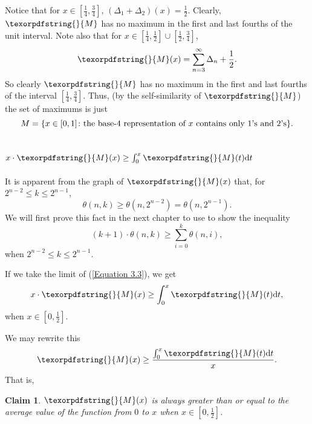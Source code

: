 \documentclass[12pt]{ucthesis}
\theoremstyle{plain}
\newtheorem{claim}{Claim}
\theoremstyle{definition}
\newcommand{\takagi}{
  \texorpdfstring{\protect}{M}
}
\begin{document}
Notice that for $x \in [\frac{1}{4}, \frac{3}{4}]$, $(\Delta_1 + \Delta_2)(x) = \frac{1}{2}$.
Clearly, $\takagi$ has no maximum in the first and last fourths of the unit interval.
Note also that for $x \in [\frac{1}{4}, \frac{1}{2}] \cup [\frac{1}{2}, \frac{3}{4}]$,
\begin{equation*}
\takagi(x) = \sum_{n = 3}^\infty \Delta_n + \frac{1}{2}.
\end{equation*}
So clearly $\takagi$ has no maximum in the first and last fourths of the interval
$[\frac{1}{4}, \frac{3}{4}]$.
Thus, (by the self-similarity of $\takagi$) the set of maximums is just
\begin{equation*}
M = \{x \in [0, 1] \colon \textnormal{the base-4 representation of } x \textnormal{ contains only 1's and 2's}\}.
\end{equation*}

\section{$x \cdot \takagi(x) \ge \int_0^x \takagi(t) \mathrm{d}t$}
\label{Section 3.4}

It is apparent from the graph of $\takagi(x)$ that, for $2^{n - 2} \le k \le 2^{n - 1}$,
\begin{equation*}
\theta(n, k) \ge \theta(n, 2^{n - 2}) = \theta(n, 2^{n - 1}).
\end{equation*}
We will first prove this fact in the next chapter to use to show the inequality
\begin{equation}
\label{Equation 3.3}
(k + 1) \cdot \theta(n, k) \ge \sum_{i = 0}^k \theta(n, i),
\end{equation}
when $2^{n - 2} \le k \le 2^{n - 1}$.

If we take the limit of (\ref{Equation 3.3}), we get
\begin{equation*}
x \cdot \takagi(x) \ge \int_0^x \takagi(t) \mathrm{d}t,
\end{equation*}
when $x \in [0, \frac{1}{2}]$.

We may rewrite this
\begin{equation*}
\takagi(x) \ge \frac{\int_0^x \takagi(t) \mathrm{d}t}{x}.
\end{equation*}
That is,
\begin{claim}
\label{Claim 2}
$\takagi(x)$ is always greater than or equal to the average value of the function
from $0$ to $x$ when $x \in [0, \frac{1}{2}]$.
\end{claim}

\end{document}
